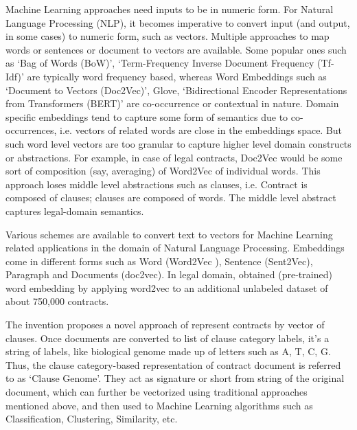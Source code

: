 \documentclass[english]{uspatent}
\begin{document}
\patentParagraph Machine Learning approaches need inputs to be in numeric form. For Natural Language Processing (NLP), it becomes imperative to convert input (and output, in some cases) to numeric form, such as vectors. Multiple approaches to map words or sentences or document to vectors are available. Some popular ones such as `Bag of Words (BoW)', `Term-Frequency Inverse Document Frequency (Tf-Idf)' are typically word frequency based, whereas Word Embeddings such as `Document to Vectors (Doc2Vec)', Glove, `Bidirectional Encoder Representations from Transformers (BERT)' are co-occurrence or contextual in nature. Domain specific embeddings tend to capture some form of semantics due to co-occurrences, i.e. vectors of related words are close in the embeddings space. But such word level vectors are too granular to capture higher level domain constructs or abstractions. For example, in case of legal contracts, Doc2Vec would be some sort of composition (say, averaging) of Word2Vec of individual words. This approach loses middle level abstractions such as clauses, i.e. Contract is composed of clauses; clauses are composed of words. The middle level abstract captures legal-domain semantics.

\patentParagraph Various schemes are available to convert text to vectors for Machine Learning related applications in the domain of Natural Language Processing. Embeddings come in different forms such as Word  (Word2Vec \cite{mikolov2013distributed}), Sentence (Sent2Vec), Paragraph and Documents (doc2vec). In legal domain, \cite{Chalkidis2017} obtained (pre-trained) word embedding by applying word2vec to an additional unlabeled dataset of about 750,000 contracts.


\patentParagraph The invention proposes a novel approach of represent contracts by vector of clauses.
Once documents are converted to list of clause category labels, it's a string of labels, like biological genome made up of letters such as A, T, C, G. Thus, the clause category-based representation of contract document is referred to as `Clause Genome'.  They act as signature or short from string of the original document, which can further be vectorized using traditional approaches mentioned above, and then used to Machine Learning algorithms such as Classification, Clustering, Similarity, etc.



\end{document}
